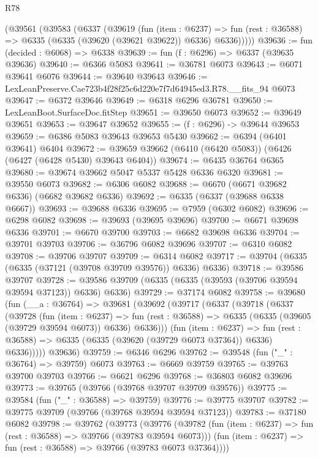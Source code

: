\begin{lexlean}{R78}
\begin{coremodule}
    (@39561
      (@39583
        (@6337
          (@39619
            (fun (item : @6237) =>
            fun (rest : @36588) => @6335 (@6335 (@39620 (@39621 @39622)) @6336) @6336)))))
@39636 := fun (decided : @6068) => @6338
@39639 := fun (f : @6296) => @6337 (@39635 @39636)
@39640 := @6366 @5083
@39641 := @36781 @6073
@39643 := @6071 @39641 @6076
@39644 := @39640 @39643
@39646 := LexLeanPreserve.Cae723b4f28f25c6d220e7f7d64945ed3.R78.__fits_94 @6073
@39647 := @6372 @39646
@39649 := @6318 @6296 @36781
@39650 := LexLeanBoot.SurfaceDoc.fitStep
@39651 := @39650 @6073
@39652 := @39649 @39651
@39653 := @39647 @39652
@39655 := (f : @6296) -> @39644 @39653
@39659 := @6386 @5083 @39643 @39653 @5430
@39662 := @6394 (@6401 @39641) @6404
@39672 := @39659 @39662 (@6410 (@6420 @5083)) (@6426 (@6427 (@6428 @5430) @39643 @6404))
@39674 := @6435 @36764 @6365
@39680 := @39674 @39662 @5047 @5337 @5428 @6336 @6320
@39681 := @39550 @6073
@39682 := @6306 @6082
@39688 := @6670 (@6671 @39682 @6336) (@6682 @39682 @6336)
@39692 := @6335 (@6337 (@39688 @6338 @6667))
@39693 := @39688 @6336
@39695 := @7959 (@6302 @6082)
@39696 := @6298 @6082
@39698 := @39693 (@39695 @39696)
@39700 := @6671 @39698 @6336
@39701 := @6670 @39700
@39703 := @6682 @39698 @6336
@39704 := @39701 @39703
@39706 := @36796 @6082 @39696
@39707 := @6310 @6082
@39708 := @39706 @39707
@39709 := @6314 @6082
@39717 := @39704 (@6335 (@6335 (@37121 (@39708 @39709 @39576)) @6336) @6336)
@39718 := @39586 @39707
@39728 := @39586 @39709 (@6335 (@6335 (@39593 (@39706 @39594 @39594 @37123)) @6336) @6336)
@39729 := @37174 @6082
@39758 := @39680
    (fun (__a : @36764) =>
    @39681
      (@39692
        (@39717
          (@6337
            (@39718
              (@6337
                (@39728
                  (fun (item : @6237) =>
                  fun (rest : @36588) => @6335 (@6335 (@39605 (@39729 @39594 @6073)) @6336) @6336)))
              (fun (item : @6237) =>
              fun (rest : @36588) => @6335 (@6335 (@39620 (@39729 @6073 @37364)) @6336) @6336)))))
      @39636)
@39759 := @6346 @6296
@39762 := @39548 (fun ("_" : @36764) => @39759) @6073
@39763 := @6669 @39759
@39765 := @39763 @39700 @39703
@39766 := @6621 @6296
@39768 := @36803 @6082 @39696
@39773 := @39765 (@39766 (@39768 @39707 @39709 @39576))
@39775 := @39584 (fun ("_" : @36588) => @39759)
@39776 := @39775 @39707
@39782 := @39775 @39709 (@39766 (@39768 @39594 @39594 @37123))
@39783 := @37180 @6082
@39798 := @39762
    (@39773
      (@39776
        (@39782 (fun (item : @6237) => fun (rest : @36588) => @39766 (@39783 @39594 @6073)))
        (fun (item : @6237) => fun (rest : @36588) => @39766 (@39783 @6073 @37364))))

\end{coremodule}
\end{lexlean}
